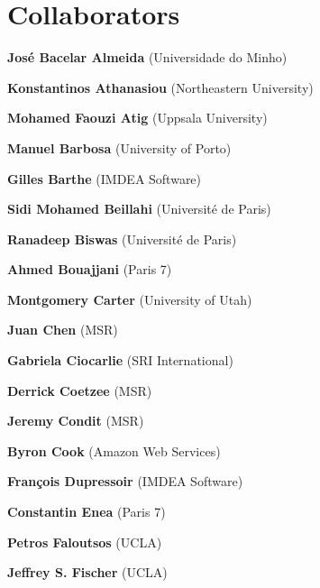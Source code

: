 \documentclass{article}
\begin{document}
  \section*{Collaborators}

  \begin{commalist}

    \item {\bf José Bacelar Almeida} (Universidade do Minho)


    \item {\bf Konstantinos Athanasiou} (Northeastern University)


    \item {\bf Mohamed Faouzi Atig} (Uppsala University)


    \item {\bf Manuel Barbosa} (University of Porto)


    \item {\bf Gilles Barthe} (IMDEA Software)


    \item {\bf Sidi Mohamed Beillahi} (Université de Paris)


    \item {\bf Ranadeep Biswas} (Université de Paris)


    \item {\bf Ahmed Bouajjani} (Paris 7)


    \item {\bf Montgomery Carter} (University of Utah)


    \item {\bf Juan Chen} (MSR)


    \item {\bf Gabriela Ciocarlie} (SRI International)


    \item {\bf Derrick Coetzee} (MSR)


    \item {\bf Jeremy Condit} (MSR)


    \item {\bf Byron Cook} (Amazon Web Services)


    \item {\bf François Dupressoir} (IMDEA Software)


    \item {\bf Constantin Enea} (Paris 7)


    \item {\bf Petros Faloutsos} (UCLA)


    \item {\bf Jeffrey S. Fischer} (UCLA)



\end{commalist}
\end{document}
